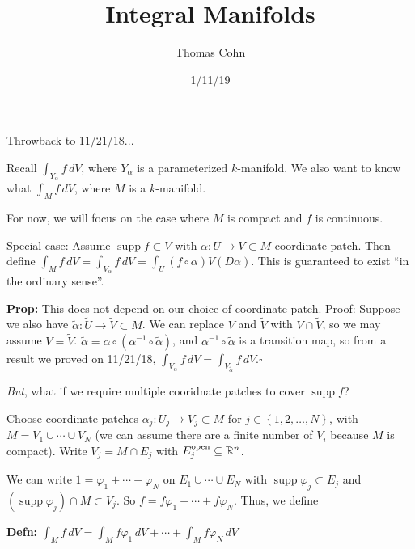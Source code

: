 \documentclass[10pt,letterpaper]{article}
\author{Thomas Cohn}
\title{Integral Manifolds}
\date{1/11/19} %
\newcommand{\n}{\hfill\break}
\newcommand{\up}{\vspace{-\baselineskip}}
\newcommand{\defn}[1]{\par\noindent\settowidth{\hangindent}{\textbf{Defn: }}\textbf{Defn: }#1\n}
\newcommand{\prop}[1]{\par\noindent\settowidth{\hangindent}{\textbf{Prop: }}\textbf{Prop: }#1\n}
\newcommand{\proven}{\;$\square$\n}
\newcommand{\ptxt}[1]{\textrm{\textnormal{#1}}}
\newcommand{\set}[1]{\left\{#1\right\}}
\newcommand{\reals}{\mathbb{R}}
\newcommand{\R}{\reals}
\newcommand{\inv}{^{-1}}
\newcommand{\of}{\circ}
\DeclareMathOperator{\supp}{supp}
\begin{document}
\maketitle
\setlength\RaggedRightParindent{\parindent}
\RaggedRight

\par\noindent Throwback to 11/21/18...\n

\par\noindent Recall $\int_{Y_{\alpha}}f\,dV$, where $Y_{\alpha}$ is a parameterized $k$-manifold.\n
We also want to know what $\int_{M}f\,dV$, where $M$ is a $k$-manifold.\n

\par\noindent For now, we will focus on the case where $M$ is compact and $f$ is continuous.\n

\par\noindent Special case: Assume $\supp{}f\subset{}V$ with $\alpha:U\to{}V\subset{}M$ coordinate patch.\n
Then define $\int_{M}f\,dV=\int_{V_{\alpha}}f\,dV=\int_{U}(f\of\alpha)V(D\alpha)$. This is guaranteed to exist ``in the ordinary sense''.\n

\prop{This does not depend on our choice of coordinate patch.\n
Proof: Suppose we also have $\tilde{\alpha}:\tilde{U}\to\tilde{V}\subset{}M$. We can replace $V$ and $\tilde{V}$ with $V\cap\tilde{V}$, so we may assume $V=\tilde{V}$. $\tilde{\alpha}=\alpha\of(\alpha\inv\of\tilde{\alpha})$, and $\alpha\inv\of\tilde{\alpha}$ is a transition map, so from a result we proved on 11/21/18, $\int_{V_{\alpha}}f\,dV=\int_{V_{\tilde{\alpha}}}f\,dV$.\proven}

\up
\par\noindent\textit{But}, what if we require multiple cooridnate patches to cover $\supp{}f$?\n

\par\noindent Choose coordinate patches $\alpha_{j}:U_{j}\to{}V_{j}\subset{}M$ for $j\in\set{1,2,\ldots,N}$, with $M=V_{1}\cup\cdots\cup{}V_{N}$ (we can assume there are a finite number of $V_{i}$ because $M$ is compact). Write $V_{j}=M\cap{}E_{j}$ with $E_{j}^{\ptxt{open}}\subseteq\R^{n}$.\n

\par\noindent We can write $1=\varphi_{1}+\cdots+\varphi_{N}$ on $E_{1}\cup\cdots\cup{}E_{N}$ with $\supp\varphi_{j}\subset{}E_{j}$ and $(\supp\varphi_{j})\cap{}M\subset{}V_{j}$.\n
So $f=f\varphi_{1}+\cdots+f\varphi_{N}$. Thus, we define\n

\defn{$\displaystyle\int_{M}f\,dV=\int_{M}f\varphi_{1}\,dV+\cdots+\int_{M}f\varphi_{N}\,dV$}
\end{document}

